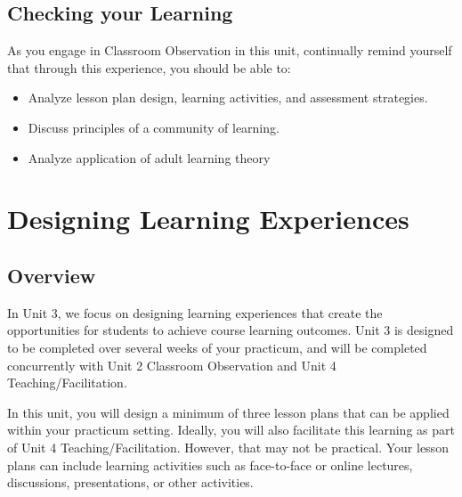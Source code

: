 \documentclass[
]{book}
\providecommand{\tightlist}{%
  \setlength{\itemsep}{0pt}\setlength{\parskip}{0pt}}
\begin{document}
\hypertarget{checking-your-learning-2}{%
\section*{Checking your Learning}\label{checking-your-learning-2}}

\begin{progress}
As you engage in Classroom Observation in this unit, continually remind yourself that through this experience, you should be able to:

\begin{itemize}
\tightlist
\item
  Analyze lesson plan design, learning activities, and assessment strategies.\\
\item
  Discuss principles of a community of learning.\\
\item
  Analyze application of adult learning theory
\end{itemize}
\end{progress}

\hypertarget{designing-learning-experiences}{%
\chapter{Designing Learning Experiences}\label{designing-learning-experiences}}

\hypertarget{overview-3}{%
\section*{Overview}\label{overview-3}}

In Unit 3, we focus on designing learning experiences that create the opportunities for students to achieve course learning outcomes. Unit 3 is designed to be completed over several weeks of your practicum, and will be completed concurrently with Unit 2 Classroom Observation and Unit 4 Teaching/Facilitation.

In this unit, you will design a minimum of three lesson plans that can be applied within your practicum setting. Ideally, you will also facilitate this learning as part of Unit 4 Teaching/Facilitation. However, that may not be practical. Your lesson plans can include learning activities such as face-to-face or online lectures, discussions, presentations, or other activities.
\end{document}
